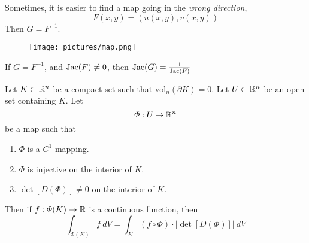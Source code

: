 \begin{remark}
    Sometimes, it is easier to find a map going in the \textit{wrong direction}, $$F(x,y) = (u(x,y),v(x,y))$$
    Then $G = F^{-1}$.
    \end{remark}
    
        \begin{figure}
        \centering
        \texttt{[image: pictures/map.png]}
    \end{figure}
    
    \begin{theorem}
    If $G = F^{-1}$, and $\textnormal{Jac}(F) \neq 0$, then $\textnormal{Jac}(G) = \frac{1}{\textnormal{Jac}(F)}$
    \end{theorem}










    \begin{theorem}
    Let $K \subset \mathbb{R}^n$ be a compact set such that $\text{vol}_n(\partial K) = 0$.  Let $U \subset \mathbb{R}^n$ be an open set containing $K$. Let $$\Phi : U \to \mathbb{R}^n$$ be a map such that 
    \begin{enumerate}
        \item $\Phi$ is a $C^1$ mapping.
        \item $\Phi$ is injective on the interior of $K$.  
        \item $\det [D(\Phi)] \neq 0$ on the interior of $K$.  
    \end{enumerate}
    Then if $f: \Phi(K) \to \mathbb{R}$ is a continuous function, then 
    $$\int_{\Phi(K)} f \  dV = \int_K(f \circ \Phi) \cdot |\det [D(\Phi)]| \ dV$$
    \end{theorem}

